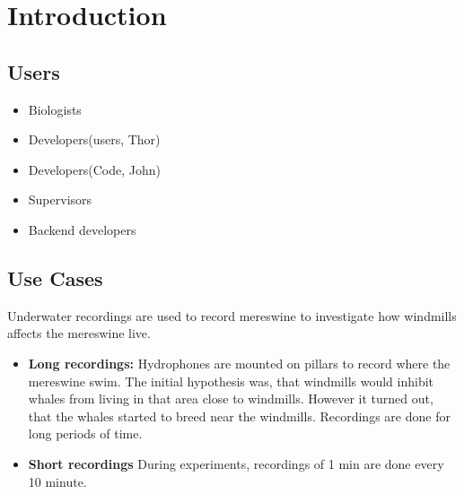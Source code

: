\chapter{Introduction}

\section{Users}

\begin{itemize}
	\item Biologists
	\item Developers(users, Thor)
	\item Developers(Code, John)
	\item Supervisors
	\item Backend developers
\end{itemize}

\section{Use Cases}

Underwater recordings are used to record mereswine to investigate how windmills affects the mereswine live.
\begin{itemize}
	\item {\textbf{Long recordings:}}  Hydrophones are mounted on pillars to record where the mereswine swim. The initial hypothesis was, that windmills would inhibit whales from living in that area close to windmills. However it turned out, that the whales started to breed near the windmills. Recordings are done for long periods of time.
	
	\item {\textbf{Short recordings}} During experiments, recordings of 1 min are done every 10 minute.

\end{itemize}



